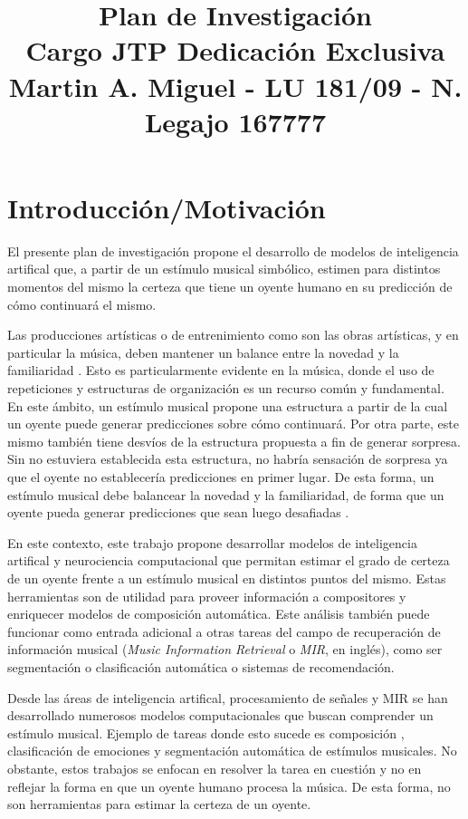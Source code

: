 \documentclass[a4paper,11pt]{article}
\title{Plan de Investigación  \\ Cargo JTP Dedicación Exclusiva \\
{\large Martin A. Miguel - LU 181/09 - N. Legajo 167777}}
\date{}
\begin{document}
\maketitle

\section*{Introducción/Motivación} 

El presente plan de investigación propone el desarrollo de modelos de
inteligencia artifical que, a partir de un estímulo musical simbólico, estimen
para distintos momentos del mismo la certeza que tiene un oyente humano en su
predicción de cómo continuará el mismo.

Las producciones artísticas o de entrenimiento como son las obras artísticas, y
en particular la música, deben mantener un balance entre la novedad y la
familiaridad \cite{berlyne1971aesthetics}. Esto es particularmente evidente en
la música, donde el uso de repeticiones y estructuras de organización
es un recurso común y fundamental. En este ámbito, un estímulo musical propone
una estructura a partir de la cual un oyente puede generar predicciones sobre
cómo continuará. Por otra parte, este mismo también tiene desvíos de la
estructura propuesta a fin de generar sorpresa. Sin no estuviera establecida
esta estructura, no habría sensación de sorpresa ya que el oyente no
establecería predicciones en primer lugar.  De esta forma, un estímulo musical
debe balancear la novedad y la familiaridad, de forma que un oyente pueda
generar predicciones que sean luego desafiadas \cite{huron2010musical,
vuust2018incongruity}.

En este contexto, este trabajo propone desarrollar modelos de inteligencia
artifical y neurociencia computacional que permitan estimar el grado de certeza
de un oyente frente a un estímulo musical en distintos puntos del mismo.
Estas herramientas son de utilidad para proveer información a compositores y
enriquecer modelos de composición automática. Este análisis también puede
funcionar como entrada adicional a otras tareas del campo de recuperación de
información musical (\emph{Music Information Retrieval} o \emph{MIR}, en
inglés), como ser segmentación o clasificación automática o sistemas de
recomendación.

Desde las áreas de inteligencia artifical, procesamiento de señales y MIR se
han desarrollado numerosos modelos computacionales que buscan comprender un
estímulo musical. Ejemplo de tareas donde esto sucede es composición
\cite{briot2020deep}, clasificación de emociones \cite{downie2008mood} y
segmentación automática \cite{mcfee2017evaluating} de estímulos musicales. No
obstante, estos trabajos se enfocan en resolver la tarea en cuestión y no
en reflejar la forma en que un oyente humano procesa la música. De esta forma,
no son herramientas para estimar la certeza de un oyente. 
\end{document}
